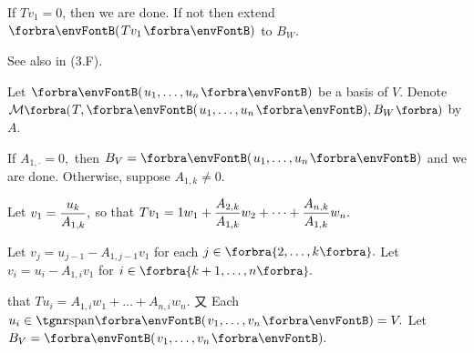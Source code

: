 If $Tv_1=0$, then we are done. If not then extend $\Par{Tv_1}$ to $B_W.$\PfEnd
\SepLine

See also in (3.F).\par\quad
Let $\Par{u_1,\dots,u_n}$ be a basis of $V$. Denote $\Mt[\BigPar]{T,\Par{u_1,\dots,u_n},B_W}$ by $A.$\par\quad
If $A_{1,\cdot}=0,$ then $B_V=\Par{u_1,\dots,u_n}$ and we are done. Otherwise, suppose $A_{1,k}\neq 0.$\vspace{2pt}\par\quad
Let $v_1={\displaystyle{\frac{u_k}{A_{1,k}}}},$ so that  $Tv_1=1w_1+{\displaystyle{\frac{A_{2,k}}{A_{1,k}}}}w_2+\dots+{\displaystyle{\frac{A_{n,k}}{A_{1,k}}}}w_n.$\vspace{6pt}\par\quad
Let $v_j=u_{j-1}-A_{1,j-1}v_1$ for each $j\in\Bra{2,\dots,k}.$ \;Let $v_i=u_i-A_{1,i} v_1$ for $i\in\Bra{k+1,\dots,n}.$\vspace{2pt}\par\quad
\NOTICE that $Tu_i=A_{1,i}w_1+\dots+A_{n,i}w_n.$ 又 Each $u_i\in\Span{v_1,\dots,v_n}=V.$ Let $B_V=\Par{v_1,\dots,v_n}.$\PfEnd
\SepLine

